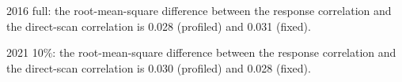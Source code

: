 2016 full: the root-mean-square difference between the response correlation and the direct-scan correlation is 0.028 (profiled) and 0.031 (fixed).

2021 10\%: the root-mean-square difference between the response correlation and the direct-scan correlation is 0.030 (profiled) and 0.028 (fixed).
